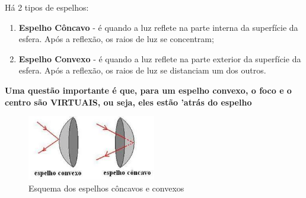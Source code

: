 \documentclass[12pt]{extarticle}
\newcommand{\<}{\langle}
\renewcommand{\>}{\rangle}
\theoremstyle{definition}
\begin{document}
Há 2 tipos de espelhos:
\begin{enumerate}
    \item \textbf{Espelho Côncavo} - é quando a luz reflete na parte interna da superfície da esfera. Após a reflexão, os raios de luz se concentram;
    \item \textbf{Espelho Convexo} - é quando a luz reflete na parte exterior da superfície da esfera. Após a reflexão, os raios de luz se distanciam um dos outros.
\end{enumerate}

\textbf{Uma questão importante é que, para um espelho convexo, o foco e o centro são VIRTUAIS, ou seja, eles estão 'atrás do espelho}

\begin{figure}[H]
    \centering
    \includegraphics[width=0.5\textwidth]{concavo_convexo.jpg}
    \caption{Esquema dos espelhos côncavos e convexos}
    \label{fig:concavos-convexos}
\end{figure}
\end{document}
